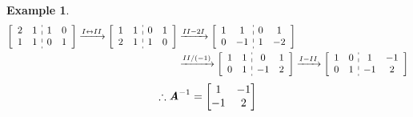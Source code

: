 \documentclass[12pt, a4paper]{article}
\newtheorem{eg}{Example}[subsection]
\def\matrixA{\textbf{\emph{A}}}
\begin{document}
\begin{eg}
\[\begin{aligned}\left[\begin{array}{c:c}\begin{matrix}2&1\\1&1\end{matrix}&\begin{matrix}1&0\\0&1\end{matrix}\end{array}\right]\xrightarrow[]{I\leftrightarrow II}\left[\begin{array}{c:c}\begin{matrix}1&1\\2&1\end{matrix}&\begin{matrix}0&1\\1&0\end{matrix}\end{array}\right]&\xrightarrow[]{II-2I}\left[\begin{array}{c:c}\begin{matrix}1&1\\0&-1\end{matrix}&\begin{matrix}0&1\\1&-2\end{matrix}\end{array}\right]\\&\xrightarrow[]{II/(-1)}\left[\begin{array}{c:c}\begin{matrix}1&1\\0&1\end{matrix}&\begin{matrix}0&1\\-1&2\end{matrix}\end{array}\right]\xrightarrow[]{I-II}\left[\begin{array}{c:c}\begin{matrix}1&0\\0&1\end{matrix}&\begin{matrix}1&-1\\-1&2\end{matrix}\end{array}\right]\end{aligned}\]
	\[\therefore\matrixA^{-1}=\begin{bmatrix}1&-1\\-1&2\end{bmatrix}\]
\end{eg}
\end{document}
